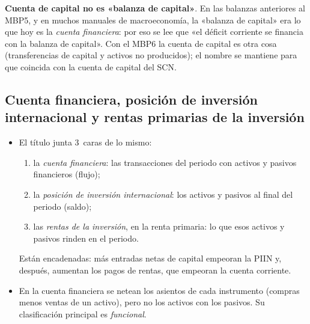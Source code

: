 \documentclass[11pt]{article}
\begin{document}
\begin{anotaciones}
\textbf{Cuenta de capital no es «balanza de capital»}. En las balanzas anteriores al MBP5, y en muchos manuales de macroeconomía, la «balanza de capital» era lo que hoy es la \emph{cuenta financiera}: por eso se lee que «el déficit corriente se financia con la balanza de capital». Con el MBP6 la cuenta de capital es otra cosa (transferencias de capital y activos no producidos); el nombre se mantiene para que coincida con la cuenta de capital del SCN\nocite{FMI2009MBP6}.
\end{anotaciones}

\subsection{Cuenta financiera, posición de inversión internacional\cortetitulo{} y rentas primarias de la inversión}\label{sec:cuenta-financiera}

\begin{itemize}
\item El título junta 3~caras de lo mismo:
  \begin{enumerate}
  \item la \emph{cuenta financiera}: las transacciones del periodo con activos y pasivos financieros (flujo);
  \item la \emph{posición de inversión internacional}: los activos y pasivos al final del periodo (saldo);
  \item las \emph{rentas de la inversión}, en la renta primaria: lo que esos activos y pasivos rinden en el periodo.
  \end{enumerate}
  Están encadenadas: más entradas netas de capital empeoran la PIIN y, después, aumentan los pagos de rentas, que empeoran la cuenta corriente.
\item En la cuenta financiera se netean los asientos de cada instrumento (compras menos ventas de un activo), pero no los activos con los pasivos. Su clasificación principal es \emph{funcional}\nocite{FMI2009MBP6}.
\end{itemize}
\end{document}
